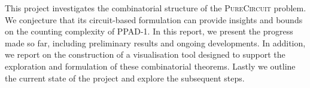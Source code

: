 This project investigates the combinatorial structure of the \textsc{PureCircuit} problem.
We conjecture that its circuit-based formulation can provide insights and bounds on the counting complexity of \textsc{PPAD-1}.
In this report, we present the progress made so far, including preliminary results and ongoing developments.
In addition, we report on the construction of a visualisation tool designed to support the exploration and formulation of these combinatorial theorems.
Lastly we outline the current state of the project and explore the subsequent steps.
